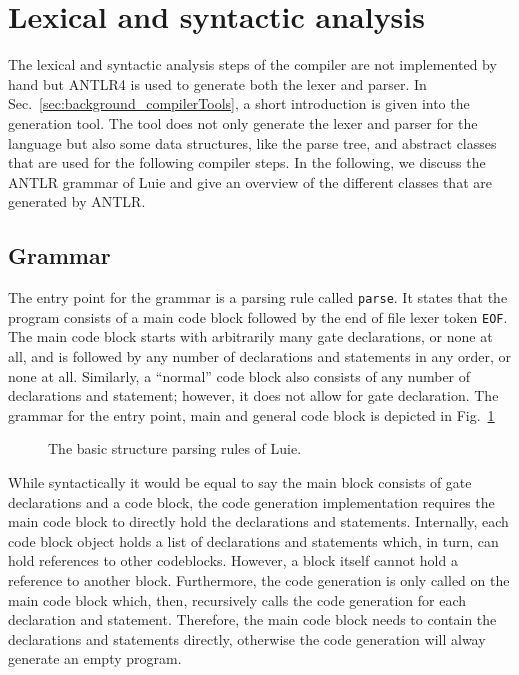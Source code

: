 \section{Lexical and syntactic analysis}
\label{sec:implementation_syntaxAnalysis}
The lexical and syntactic analysis steps of the compiler are not implemented by hand but ANTLR4 is used to generate both the lexer and parser. In Sec.~\ref{sec:background_compilerTools}, a short introduction is given into the generation tool. The tool does not only generate the lexer and parser for the language but also some data structures, like the parse tree, and abstract classes that are used for the following compiler steps. In the following, we discuss the ANTLR grammar of Luie and give an overview of the different classes that are generated by ANTLR.

\subsection{Grammar}
\label{sec:implementation_grammar}
The entry point for the grammar is a parsing rule called \texttt{parse}. It states that the program consists of a main code block followed by the end of file lexer token \texttt{EOF}. The main code block starts with arbitrarily many gate declarations, or none at all, and is followed by any number of declarations and statements in any order, or none at all. Similarly, a ``normal'' code block also consists of any number of declarations and statement; however, it does not allow for gate declaration. The grammar for the entry point, main and general code block is depicted in Fig.~\ref{fig:implementation_grammarStructure}

\begin{figure}[htp]
    \centering
    
    \caption{The basic structure parsing rules of Luie.}
    \label{fig:implementation_grammarStructure}
\end{figure}

While syntactically it would be equal to say the main block consists of gate declarations and a code block, the code generation implementation requires the main code block to directly hold the declarations and statements. Internally, each code block object holds a list of declarations and statements which, in turn, can hold references to other codeblocks. However, a block itself cannot hold a reference to another block. Furthermore, the code generation is only called on the main code block which, then, recursively calls the code generation for each declaration and statement. Therefore, the main code block needs to contain the declarations and statements directly, otherwise the code generation will alway generate an empty program. 

